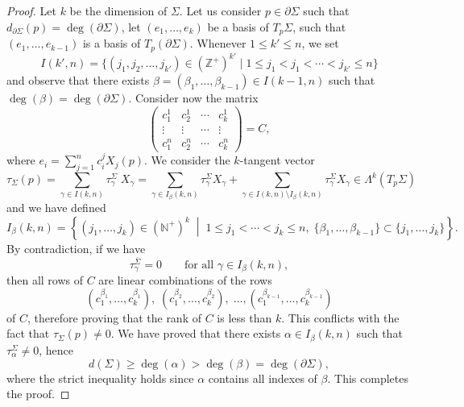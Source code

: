 \documentclass[10pt,a4paper]{amsart}
\newcommand{\Z}{\mathbb{Z}}
\begin{document}
\begin{proof}
Let $k$ be the dimension of $\Sigma$. Let us consider $p\in\partial \Sigma$ such that $d_{\partial\Sigma}(p)=\deg(\partial \Sigma)$, let $(e_1,\ldots,e_k)$ be a basis of $T_p\Sigma$, such that $(e_1,\ldots,e_{k-1})$ is a basis of $T_p(\partial \Sigma)$. Whenever $1\le k'\le n$, we set
\[
I(k',n)=\{(j_1,j_2,\ldots,j_{k'})\in(\Z^+)^{k'}\mid  1\le j_1<j_1<\cdots<j_{k'}\le n \}
\]
and observe that there exists $\beta=(\beta_1,\ldots,\beta_{k-1})\in I(k-1,n)$ such that $\deg(\beta)=\deg(\partial \Sigma)$.
Consider now the matrix
\[
\left(
\begin{array}{cccc}
c_1^1 & c_2^1 & \cdots  & c_k^1 \\
\vdots & \vdots & \cdots & \vdots \\
c_1^n & c_2^n & \cdots  & c_k^n
\end{array}
\right)
=
C,
\]
where $e_i=\sum_{j=1}^n c_i^j X_j(p)$. We consider the $k$-tangent vector 
\[
\tau_{\Sigma}(p)=\sum_{\gamma\in I(k,n)}\tau_{\gamma}^{\Sigma}\; X_{\gamma}
=\sum_{\gamma\in I_{\beta}(k,n)}\tau_{\gamma}^{\Sigma} X_{\gamma}
+\sum_{\gamma\in I(k,n)\setminus I_{\beta}(k,n)}\tau_{\gamma}^{\Sigma} X_{\gamma}
\in\Lambda^k(T_p\Sigma)
\]
and we have defined
\[
I_{\beta}(k,n)
=
\left\{
(j_1,\ldots,j_k)\in (\mathbb N^+)^k
\;\middle|\;
1\leq j_1<\cdots<j_k\leq n,\;
\{\beta_1,\ldots,\beta_{k-1}\}
\subset
\{j_1,\ldots,j_k\}
\right\}.
\]
By contradiction, if we have 
\[
\tau_{\gamma}^{\bar\Sigma}=0
\qquad
\text{for all } \gamma\in I_{\beta}(k,n),
\]
then all rows of \(C\) are linear combinations of the rows
\[
(c_1^{\beta_1},\ldots,c_k^{\beta_1}), \; 
(c_1^{\beta_2},\ldots,c_k^{\beta_2}), \; 
\ldots,
(c_1^{\beta_{k-1}},\ldots,c_k^{\beta_{k-1}})
\]
of \(C\), therefore proving that the rank of $C$ is less than $k$. 
This conflicts with the fact that $\tau_\Sigma(p)\neq0$.
We have proved that there exists $\alpha\in I_{\beta}(k,n)$ such that 
$\tau^\Sigma_{\alpha}\neq0$, hence 
\[
d(\Sigma)\ge \deg(\alpha)>\deg(\beta)=\deg(\partial \Sigma),
\]
where the strict inequality holds since $\alpha$ contains all indexes of $\beta$.
This completes the proof.
\end{proof}
\end{document}
